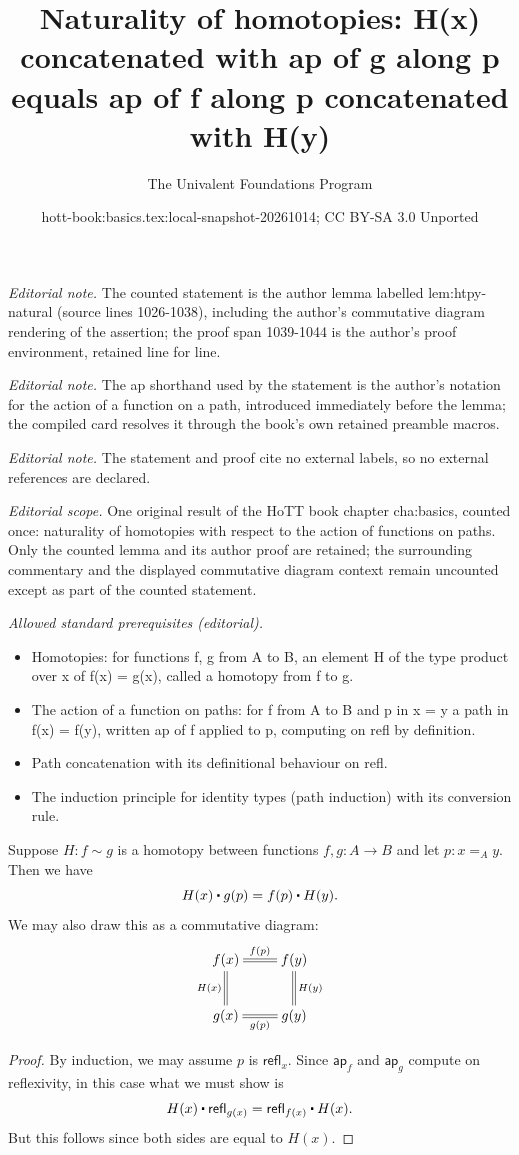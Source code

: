 \documentclass[10pt,a4paper]{article}
\title{Naturality of homotopies: H(x) concatenated with ap of g along p equals ap of f along p concatenated with H(y)}
\author{The Univalent Foundations Program}
\date{hott-book:basics.tex:local-snapshot-20261014; CC BY-SA 3.0 Unported}
\newcounter{chapter}
\providecommand{\index}[1]{}
\newcommand{\id}[3][]{\ensuremath{#2 =_{#1} #3}\xspace}
\newcommand{\refl}[1]{\ensuremath{\mathsf{refl}_{#1}}\xspace}
\newcommand{\ct}{%
  \mathchoice{\mathbin{\raisebox{0.5ex}{$\displaystyle\centerdot$}}}%
             {\mathbin{\raisebox{0.5ex}{$\centerdot$}}}%
             {\mathbin{\raisebox{0.25ex}{$\scriptstyle\,\centerdot\,$}}}%
             {\mathbin{\raisebox{0.1ex}{$\scriptscriptstyle\,\centerdot\,$}}}
}
\newcommand{\mapfunc}[1]{\ensuremath{\mathsf{ap}_{#1}}\xspace} %
\newcommand{\map}[2]{\ensuremath{{#1}\mathopen{}\left({#2}\right)\mathclose{}}\xspace}
\let\apfunc\mapfunc
\let\ap\map
\newcommand{\htpy}{\sim}
\theoremstyle{definition}
\theoremstyle{remark}
\numberwithin{equation}{section}
\begin{document}
\maketitle
\noindent\textit{Editorial note.} The counted statement is the author lemma labelled lem:htpy-natural (source lines 1026-1038), including the author's commutative diagram rendering of the assertion; the proof span 1039-1044 is the author's proof environment, retained line for line.\par\medskip
\noindent\textit{Editorial note.} The ap shorthand used by the statement is the author's notation for the action of a function on a path, introduced immediately before the lemma; the compiled card resolves it through the book's own retained preamble macros.\par\medskip
\noindent\textit{Editorial note.} The statement and proof cite no external labels, so no external references are declared.\par\medskip
\noindent\textit{Editorial scope.} One original result of the HoTT book chapter cha:basics, counted once: naturality of homotopies with respect to the action of functions on paths. Only the counted lemma and its author proof are retained; the surrounding commentary and the displayed commutative diagram context remain uncounted except as part of the counted statement.\par\medskip
\noindent\textit{Allowed standard prerequisites (editorial).}\begin{itemize}
\item Homotopies: for functions f, g from A to B, an element H of the type product over x of f(x) = g(x), called a homotopy from f to g.
\item The action of a function on paths: for f from A to B and p in x = y a path in f(x) = f(y), written ap of f applied to p, computing on refl by definition.
\item Path concatenation with its definitional behaviour on refl.
\item The induction principle for identity types (path induction) with its conversion rule.
\end{itemize}\medskip
\begin{lem}\label{lem:htpy-natural}
  Suppose $H:f\htpy g$ is a homotopy between functions $f,g:A\to B$ and let $p:\id[A]xy$.  Then we have
  \begin{equation*}
    H(x)\ct\ap{g}{p}=\ap{f}{p}\ct H(y).
  \end{equation*}
  We may also draw this as a commutative diagram:\index{diagram}
  \begin{align*}
    \xymatrix{
      f(x) \ar@{=}[r]^{\ap fp} \ar@{=}[d]_{H(x)} & f(y) \ar@{=}[d]^{H(y)} \\
      g(x) \ar@{=}[r]_{\ap gp} & g(y)
    }
  \end{align*}
\end{lem}

\begin{proof}
  By induction, we may assume $p$ is $\refl x$.
  Since $\apfunc{f}$ and $\apfunc g$ compute on reflexivity, in this case what we must show is
  \[ H(x) \ct \refl{g(x)} = \refl{f(x)} \ct H(x). \]
  But this follows since both sides are equal to $H(x)$.
\end{proof}
\end{document}
